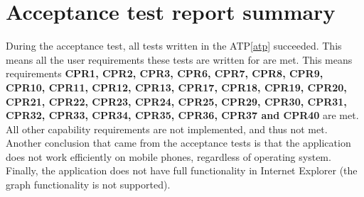 \chapter{Acceptance test report summary}

During the acceptance test, all tests written in the ATP\ref{atp} succeeded. This means all the user requirements these tests are written for are met. This means requirements \textbf{CPR1, CPR2, CPR3, CPR6, CPR7, CPR8, CPR9, CPR10, CPR11, CPR12, CPR13, CPR17, CPR18, CPR19, CPR20, CPR21, CPR22, CPR23, CPR24, CPR25, CPR29, CPR30, CPR31, CPR32, CPR33, CPR34, CPR35, CPR36, CPR37 and CPR40} are met. All other capability requirements are not implemented, and thus not met. Another conclusion that came from the acceptance tests is that the application does not work efficiently on mobile phones, regardless of operating system. Finally, the application does not have full functionality in Internet Explorer (the graph functionality is not supported).
